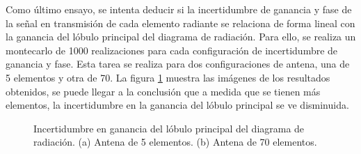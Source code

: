 Como último ensayo, se intenta deducir si la incertidumbre de ganancia y fase de la señal en transmisión de cada elemento 
radiante se relaciona de forma lineal con la ganancia del lóbulo principal del diagrama de radiación. Para ello, se realiza
un montecarlo de 1000 realizaciones para cada configuración de incertidumbre de ganancia y fase. Esta tarea se realiza para dos
configuraciones de antena, una de 5 elementos y otra de 70. La figura \ref{fig:antennaMontecarlo} muestra las imágenes de los 
resultados obtenidos, se puede llegar a la conclusión que a medida que se tienen más elementos, la incertidumbre en la 
ganancia del lóbulo principal se ve disminuida.

\begin{figure}[H]
	\centering
	\caption{Incertidumbre en ganancia del lóbulo principal del diagrama de radiación. (a) Antena de 5 elementos. (b) Antena de 
	70 elementos.}
	\label{fig:antennaMontecarlo}
\end{figure}

